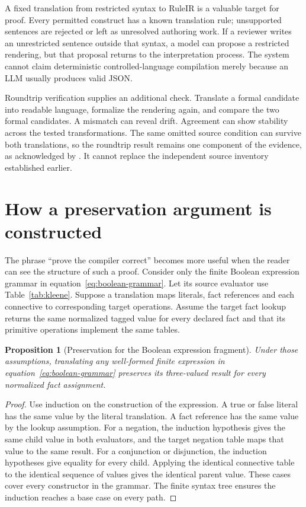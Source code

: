 \documentclass[12pt,a4paper,oneside,openany]{book}
\newtheorem{proposition}{Proposition}[chapter]
\begin{document}
A fixed translation from restricted syntax to RuleIR is a valuable target for
proof. Every permitted construct has a known translation rule; unsupported
sentences are rejected or left as unresolved authoring work. If a reviewer
writes an unrestricted sentence outside that syntax, a model can propose a
restricted rendering, but that proposal returns to the interpretation process.
The system cannot claim deterministic controlled-language compilation merely
because an LLM usually produces valid JSON.

Roundtrip verification supplies an additional check. Translate a formal
candidate into readable language, formalize the rendering again, and compare
the two formal candidates. A mismatch can reveal drift. Agreement can show
stability across the tested transformations. The same omitted source condition
can survive both translations, so the roundtrip result remains one component
of the evidence, as acknowledged by \citet[method and limitations]{roundtrip2026}.
It cannot replace the independent source inventory established earlier.

\section{How a preservation argument is constructed}
\label{sec:proof-induction}
The phrase ``prove the compiler correct'' becomes more useful when the reader
can see the structure of such a proof. Consider only the finite Boolean
expression grammar in equation~\eqref{eq:boolean-grammar}. Let its source
evaluator use Table~\ref{tab:kleene}. Suppose a translation maps literals,
fact references and each connective to corresponding target operations.
Assume the target fact lookup returns the same normalized tagged value for
every declared fact and that its primitive operations implement the same
tables.

\begin{proposition}[Preservation for the Boolean expression fragment]
Under those assumptions, translating any well-formed finite expression in
equation~\eqref{eq:boolean-grammar} preserves its three-valued result for every
normalized fact assignment.
\label{prop:boolean-preservation}
\end{proposition}
\begin{proof}
Use induction on the construction of the expression. A true or false literal
has the same value by the literal translation. A fact reference has the same
value by the lookup assumption. For a negation, the induction hypothesis gives
the same child value in both evaluators, and the target negation table maps
that value to the same result. For a conjunction or disjunction, the induction
hypotheses give equality for every child. Applying the identical connective
table to the identical sequence of values gives the identical parent value.
These cases cover every constructor in the grammar. The finite syntax tree
ensures the induction reaches a base case on every path.
\end{proof}
\end{document}
